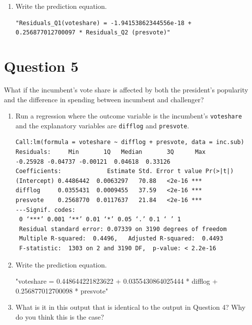 \documentclass[12pt,letterpaper]{article}
\begin{document}
\begin{enumerate}
\begin{figure}[h!]
\end{figure}	
\vspace{5cm}
		\item Write the prediction equation.
 
\begin{verbatim}
"Residuals_Q1(voteshare) = -1.94153862344556e-18 + 
0.256877012700097 * Residuals_Q2 (presvote)"
\end{verbatim} 	
	\end{enumerate}
	
	\newpage	

\section*{Question 5}
\noindent What if the incumbent's vote share is affected by both the president's popularity and the difference in spending between incumbent and challenger? 
	\begin{enumerate}
		\item Run a regression where the outcome variable is the incumbent's \texttt{voteshare} and the explanatory variables are \texttt{difflog} and \texttt{presvote}.	
 
\begin{verbatim}	
Call:lm(formula = voteshare ~ difflog + presvote, data = inc.sub)
Residuals:     Min       1Q   Median       3Q      Max 
-0.25928 -0.04737 -0.00121  0.04618  0.33126 
Coefficients:             Estimate Std. Error t value Pr(>|t|)    
(Intercept) 0.4486442  0.0063297   70.88   <2e-16 ***
difflog     0.0355431  0.0009455   37.59   <2e-16 ***
presvote    0.2568770  0.0117637   21.84   <2e-16 ***
---Signif. codes: 
 0 ‘***’ 0.001 ‘**’ 0.01 ‘*’ 0.05 ‘.’ 0.1 ‘ ’ 1
 Residual standard error: 0.07339 on 3190 degrees of freedom
 Multiple R-squared:  0.4496,	Adjusted R-squared:  0.4493 
 F-statistic:  1303 on 2 and 3190 DF,  p-value: < 2.2e-16
\end{verbatim} 	
		\item Write the prediction equation.
 	
"voteshare = 0.448644221823622 + 0.0355430864025444 * difflog + 0.256877012700098 * presvote" \vspace{6cm}
		\item What is it in this output that is identical to the output in Question 4? Why do you think this is the case?
		
		\end{enumerate}
\end{document}
